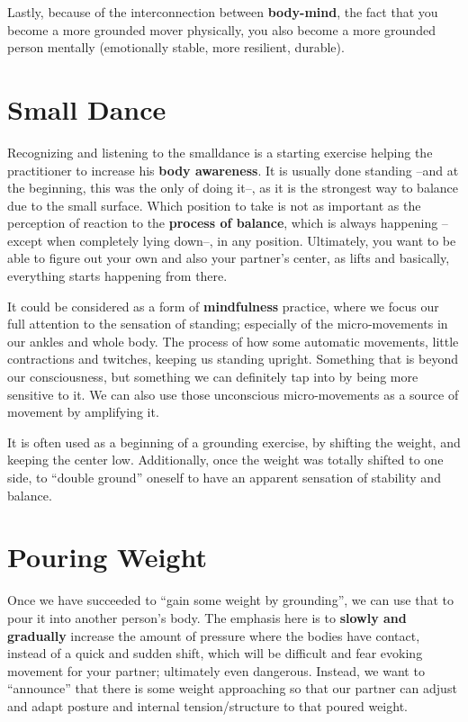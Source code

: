 Lastly, because of the interconnection between \textbf{body-mind}, the fact that you become a more grounded mover physically, you also become a more grounded person mentally (emotionally stable, more resilient, durable).

\section{Small Dance}\label{sec:small-dance}

Recognizing and listening to the \gls{smalldance} is a starting exercise helping the practitioner to increase his \textbf{body awareness}.
It is usually done standing --and at the beginning, this was the only of doing it--, as it is the strongest way to balance due to the small surface.
Which position to take is not as important as the perception of reaction to the \textbf{process of balance}, which is always happening --except when completely lying down--, in any position.
Ultimately, you want to be able to figure out your own and also your partner's center, as lifts and basically, everything starts happening from there.

It could be considered as a form of \textbf{mindfulness} practice, where we focus our full attention to the sensation of standing; especially of the micro-movements in our ankles and whole body.
The process of how some automatic movements, little contractions and twitches, keeping us standing upright.
Something that is beyond our consciousness, but something we can definitely tap into by being more sensitive to it.
We can also use those unconscious micro-movements as a source of movement by amplifying it.

It is often used as a beginning of a grounding exercise, by shifting the weight, and keeping the center low.
Additionally, once the weight was totally shifted to one side, to ``double ground'' oneself to have an apparent sensation of stability and balance.

\section{Pouring Weight}\label{sec:pouring-weight}

Once we have succeeded to ``gain some weight by grounding'', we can use that to pour it into another person's body.
The emphasis here is to \textbf{slowly and gradually} increase the amount of pressure where the bodies have contact, instead of a quick and sudden shift, which will be difficult and fear evoking movement for your partner; ultimately even dangerous.
Instead, we want to ``announce'' that there is some weight approaching so that our partner can adjust and adapt posture and internal tension/structure to that poured weight.


